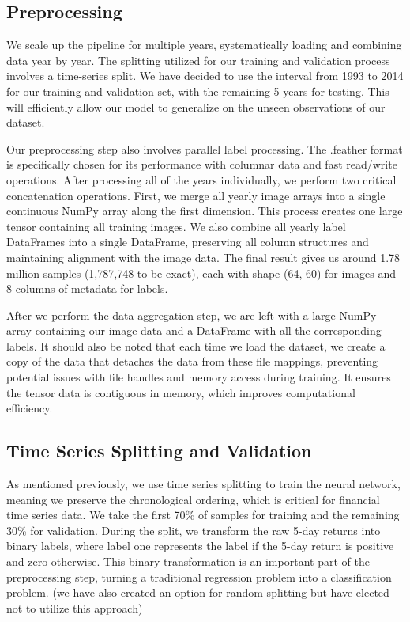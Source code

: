 \documentclass[12pt]{article}
\begin{document}
\subsection*{Preprocessing}

We scale up the pipeline for multiple years, systematically loading and combining data year by year. The splitting utilized for our training and validation process involves a time-series split. We have decided to use the interval from 1993 to 2014 for our training and validation set, with the remaining 5 years for testing. This will efficiently allow our model to generalize on the unseen observations of our dataset.

Our preprocessing step also involves parallel label processing. The .feather format is specifically chosen for its performance with columnar data and fast read/write operations. After processing all of the years individually, we perform two critical concatenation operations. First, we merge all yearly image arrays into a single continuous NumPy array along the first dimension. This process creates one large tensor containing all training images. We also combine all yearly label DataFrames into a single DataFrame, preserving all column structures and maintaining alignment with the image data. The final result gives us around 1.78 million samples (1,787,748 to be exact), each with shape (64, 60) for images and 8 columns of metadata for labels.

After we perform the data aggregation step, we are left with a large NumPy array containing our image data and a DataFrame with all the corresponding labels. It should also be noted that each time we load the dataset, we create a copy of the data that detaches the data from these file mappings, preventing potential issues with file handles and memory access during training. It ensures the tensor data is contiguous in memory, which improves computational efficiency.

\subsection*{Time Series Splitting and Validation}

As mentioned previously, we use time series splitting to train the neural network, meaning we preserve the chronological ordering, which is critical for financial time series data. We take the first 70\% of samples for training and the remaining 30\% for validation. During the split, we transform the raw 5-day returns into binary labels, where label one represents the label if the 5-day return is positive and zero otherwise. This binary transformation is an important part of the preprocessing step, turning a traditional regression problem into a classification problem. (we have also created an option for random splitting but have elected not to utilize this approach)
\end{document}
